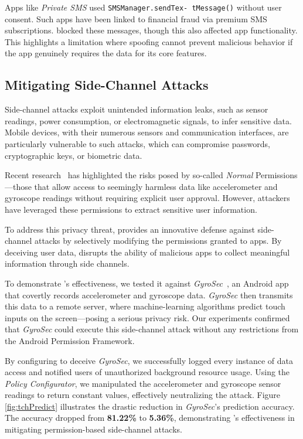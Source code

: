  Apps like \textit{Private SMS} used \texttt{SMSManager.sendTex- tMessage()} without user consent. Such apps have been linked to financial fraud via premium SMS subscriptions. \framework{} blocked these messages, though this also affected app functionality. This highlights a limitation where spoofing cannot prevent malicious behavior if the app genuinely requires the data for its core features.




\subsection{Mitigating Side-Channel Attacks}
\label{sec:side_channel_attack}
Side-channel attacks exploit unintended information leaks, such as sensor readings, power consumption, or electromagnetic signals, to infer sensitive data. Mobile devices, with their numerous sensors and communication interfaces, are particularly vulnerable to such attacks, which can compromise passwords, cryptographic keys, or biometric data.

Recent research~\cite{hasan2013sensing, simon2013pin, ba2020learning, shen2015input} has highlighted the risks posed by so-called \textit{Normal} Permissions—those that allow access to seemingly harmless data like accelerometer and gyroscope readings without requiring explicit user approval. However, attackers have leveraged these permissions to extract sensitive user information.

To address this privacy threat, \framework{} provides an innovative defense against side-channel attacks by selectively modifying the permissions granted to apps. By deceiving user data, \framework{} disrupts the ability of malicious apps to collect meaningful information through side channels.

To demonstrate \framework{}'s effectiveness, we tested it against \textit{GyroSec}~\cite{lin2019motion}, an Android app that covertly records accelerometer and gyroscope data. \textit{GyroSec} then transmits this data to a remote server, where machine-learning algorithms predict touch inputs on the screen—posing a serious privacy risk. Our experiments confirmed that \textit{GyroSec} could execute this side-channel attack without any restrictions from the Android Permission Framework.

By configuring \framework{} to deceive \textit{GyroSec}, we successfully logged every instance of data access and notified users of unauthorized background resource usage. Using the \textit{Policy Configurator}, we manipulated the accelerometer and gyroscope sensor readings to return constant values, effectively neutralizing the attack. Figure \ref{fig:tchPredict} illustrates the drastic reduction in \textit{GyroSec}'s prediction accuracy. The accuracy dropped from \textbf{81.22\%} to \textbf{5.36\%}, demonstrating \framework{}'s effectiveness in mitigating permission-based side-channel attacks.

